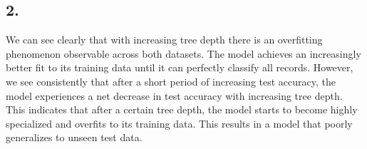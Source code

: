 \documentclass{article}
\begin{document}
    \subsection*{2.}

    We can see clearly that with increasing tree depth there is an overfitting phenomenon observable across both datasets. The model achieves an
    increasingly better fit to its training data until it can perfectly classify all records. However, we see consistently that after a short
    period of increasing test accuracy, the model experiences a net decrease in test accuracy with increasing tree depth. This indicates that
    after a certain tree depth, the model starts to become highly specialized and overfits to its training data. This results in a model that poorly
    generalizes to unseen test data.
\end{document}
